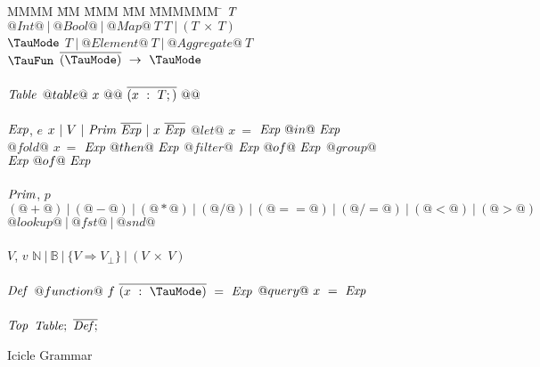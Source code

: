 
\begin{figure}

\begin{tabbing}
MMMM \= MM \= MMM \= MM \= MMMMMM \= \kill
$\mathit{T}$
\GrammarDef
  $@Int@~|~@Bool@~|~@Map@~T~T~|~(T~\times~T)$
\\
$\mi{\TauMode}$
\GrammarDef
  $T~|~@Element@~T~|~@Aggregate@~T$
\\
$\mi{\TauFun}$
\GrammarDef
  $\ov{(\TauMode)}~\to~\TauMode$
\\
\\

$\mathit{Table}$
\GrammarDef
  $@table@~x~@{@~\overline{(x~:~T;)}~@}@$
\\
\\

$\mathit{Exp}$, $e$
\GrammarDef
  $x~|~V~|~\mathit{Prim}~\overline{\mathit{Exp}}~|~x~\overline{\mathit{Exp}}$
\GrammarAlt
  $@let@$   \> $x~=$ \> $\mathit{Exp}~@  in@~\mathit{Exp}$
\GrammarAlt
  $@fold@$  \> $x~=$ \> $\mathit{Exp}~@then@~\mathit{Exp}$
\GrammarAlt
  $@filter@$\> \> $\mathit{Exp}~@  of@~\mathit{Exp}$
\GrammarAlt
  $@group@$ \> \> $\mathit{Exp}~@  of@~\mathit{Exp}$
\\
\\

$\mathit{Prim}$, $p$
\GrammarDef
  $(@+@)~|~(@-@)~|~(@*@)~|~(@/@)~|~(@==@)~|~(@/=@)~|~(@<@)~|~(@>@)$
\GrammarAlt
  $@lookup@~|~@fst@~|~@snd@$
\\
\\

$V$, $v$
\GrammarDef
 $\mathbb{N}~|~\mathbb{B}~|~\{V \Rightarrow V_\bot\}~|~(V~\times~V)$
\\
\\


$\mathit{Def}$
\GrammarDef
  $@function@~f~\ov{(x~:~\TauMode)}~=~\mi{Exp}$
\GrammarAlt
  $@query@~x~=~\mathit{Exp}$
\\
\\
$\mathit{Top}$
\GrammarDef
  $\mathit{Table};~\overline{\mathit{Def};}$
\end{tabbing}

\caption{Icicle Grammar}
\label{fig:source:grammar}
\end{figure}

